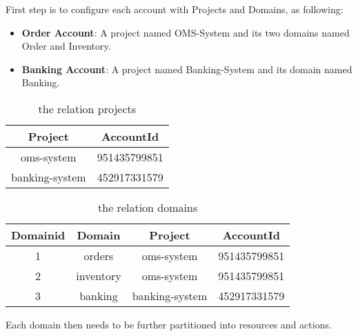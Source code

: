 First step is to configure each account with Projects and Domains, as following:
\begin{itemize}
    \item \textbf{Order Account}: A project named OMS-System and its two domains named Order and Inventory.
    \item \textbf{Banking Account}: A project named Banking-System and its domain named Banking.
\end{itemize}

\begin{table}[h]
    \caption{the relation projects}
    \label{table:table-projects}
    \begin{center}
    \begin{tabular}{|c|c|}
    \hline
    Project & AccountId\\
    \hline
    oms-system & 951435799851 \\
    \hline
    banking-system & 452917331579 \\
    \hline
    \end{tabular}
    \end{center}
\end{table}

\begin{table}[h]
    \caption{the relation domains}
    \label{table:table-domains}
    \begin{center}
    \begin{tabular}{|c|c|c|c|}
    \hline
    Domainid & Domain & Project & AccountId\\
    \hline
    1 & orders & oms-system & 951435799851\\
    \hline
    2 & inventory & oms-system & 951435799851\\
    \hline
    3 & banking & banking-system & 452917331579\\
    \hline
    \end{tabular}
    \end{center}
\end{table}

Each domain then needs to be further partitioned into resources and actions.

